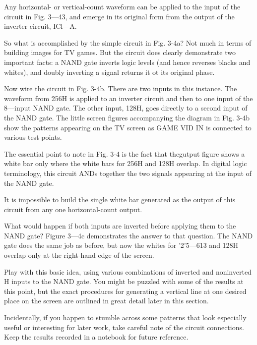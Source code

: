 \documentclass[11pt]{book}              %
\begin{document}
Any horizontal- or vertical-count waveform can be applied to the input of the circuit in Fig. 3—43, and emerge in its original form from the output of the inverter circuit, ICl—A.


So what is accomplished by the simple circuit in Fig. 3-4a? Not much in terms of building images for TV games. But the circuit does clearly demonstrate two important facts: a NAND gate inverts logic levels (and hence reverses blacks and whites), and doubly inverting a signal returns it ot its original phase.


Now wire the circuit in Fig. 3-4b. There are two inputs in this instance. The waveform from 256H is applied to an inverter circuit and then to one input of the 8—input NAND gate. The other input, 128H, goes directly to a second input of the NAND gate. The little screen figures accompanying the diagram in Fig. 3-4b show the patterns appearing on the TV screen as GAME VID IN is connected to various test points.

The essential point to note in Fig. 3-4 is the fact that thegutput figure shows a white bar only where the white bars for 256H and 128H overlap. In digital logic terminology, this circuit ANDs together the two signals appearing at the input of the NAND gate.

It is impossible to build the single white bar generated as the output of this circuit from any one horizontal-count output.

What would happen if both inputs are inverted before applying them to the NAND gate? Figure 3—4c demonstrates the answer to that question. The NAND gate does the same job as before, but now the whites for '2'5—613 and 128H overlap only at the right-hand edge of the screen.

Play with this basic idea, using various combinations of inverted and noninverted H inputs to the NAND gate. You might be puzzled with some of the results at this point, but the exact procedures for generating a vertical line at one desired place on the screen are outlined in great detail later in this section.

Incidentally, if you happen to stumble across some patterns that look especially useful or interesting for later work, take careful note of the circuit connections. Keep the results recorded in a notebook for future reference.
\end{document}
